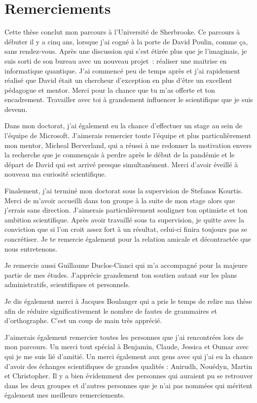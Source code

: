 \begin{comment}
\end{comment}

\chapter*{Remerciements}

Cette thèse conclut mon parcours à l'Université de Sherbrooke.
Ce parcours à débuter il y a cinq ans,
lorsque j'ai cogné à la porte de David Poulin,
comme ça, sans rendez-vous.
Après une discussion qui s'est étirée plus que je l'imaginais,
je suis sorti de son bureau avec un nouveau projet~:
réaliser une maitrise en informatique quantique.
J'ai commencé peu de temps après et j'ai rapidement réalisé que David 
était un chercheur d'exception en plus d'être un excellent pédagogue et mentor.
Merci pour la chance que tu m'as offerte et ton encadrement.
Travailler avec toi à grandement influencer le scientifique que je suis devenu.

Dans mon doctorat,
j'ai également eu la chance d'effectuer un stage au sein de l'équipe de Microsoft.
J'aimerais remercier toute l'équipe et plus particulièrement mon mentor,
Micheal Berverland, qui a réussi à me redonner la motivation envers la recherche
que je commençais à perdre après le début de la pandémie et le départ de David qui est
arrivé presque simultanément.
Merci d'avoir éveillé à nouveau ma curiosité scientifique.

Finalement,
j'ai terminé mon doctorat sous la supervision de Stefanos Kourtis.
Merci de m'avoir accueilli dans ton groupe à la suite de mon stage alors que j'errais sans direction.
J'aimerais particulièrement souligner ton optimiste et ton ambition scientifique.
Après avoir travaillé sous ta supervision,
je quitte avec la conviction que si l'on croit assez fort à un résultat,
celui-ci finira toujours pas se concrétiser.
Je te remercie également pour la relation amicale et décontractée que nous entretenons.

Je remercie aussi Guillaume Duclos-Cianci qui m'a accompagné pour la majeure partie de mes études.
J'apprécie grandement ton soutien autant sur les plans administratifs, 
scientifiques et personnels.

Je dis également merci à Jacques Boulanger qui a pris le temps de relire ma thèse afin de réduire
significativement le nombre de fautes de grammaires et d'orthographe. C'est un coup de main très apprécié.  

J'aimerais également remercier toutes les personnes que j'ai rencontrées lors de mon parcours.
Un merci tout spécial à Benjamin, Claude, Jessica et Oumar avec qui je me suis lié d'amitié.
Un merci également aux gens avec qui j'ai eu la chance d'avoir des échanges scientifiques
de grandes qualités :  Anirudh, Nouédyn, Martin et Christopher.
Il y a bien évidemment des personnes qui auraient pu se retrouver dans les deux groupes
et d'autres personnes que je n'ai pas nommées qui méritent également mes meilleurs remerciements. 

